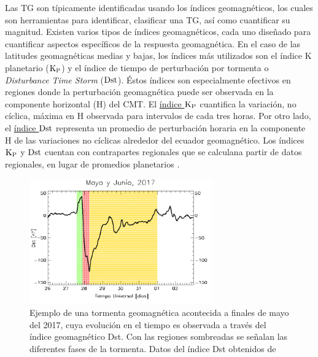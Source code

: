 Las TG son típicamente identificadas usando los índices geomagnéticos, los cuales son herramientas para identificar, clasificar una TG, así como cuantificar su magnitud. Existen varios tipos de índices geomagnéticos, cada uno diseñado para cuantificar aspectos específicos de la respuesta geomagnética. En el caso de las latitudes geomagnéticas medias y bajas, los índices más utilizados son el índice K planetario (${\rm K_P}$) y el índice de tiempo de perturbación por tormenta o \emph{Disturbance Time Storm} (${\rm Dst}$). Éstos índices son especialmente efectivos en regiones donde la perturbación geomagnética puede ser observada en la componente horizontal (H) del CMT. El  \href{https://www.gfz-potsdam.de/en/section/geomagnetism/data-products-services/geomagnetic-kp-index}{índice ${\rm K_P}$} cuantifica la variación, no cíclica, máxima en H observada para intervalos de cada tres horas. Por otro lado, el \href{https://wdc.kugi.kyoto-u.ac.jp/dstae/index.html}{índice ${\rm Dst}$} representa un promedio de perturbación horaria en la componente H de las variaciones no cíclicas alrededor del ecuador geomagnético. Los índices ${\rm K_P}$ y ${\rm Dst}$ cuentan con contrapartes regionales que se calculana partir de datos regionales, en lugar de promedios planetarios \parencite{mayaud1980}. 
\vspace{ 1 em}


\begin{figure}[h!]
	\begin{center}
 		\includegraphics[width = 0.7\textwidth]{Images/dst_ex2017-05-26.png}
 	\end{center}
 	\caption{\label{tgm_ex} Ejemplo de una tormenta geomagnética acontecida a finales de mayo del 2017, cuya evolución en el tiempo es observada a través del índice geomagnético Dst. Con las regiones sombreadas se señalan las diferentes fases de la tormenta. Datos del índice Dst obtenidos de \cite{idx}} 
\end{figure}

